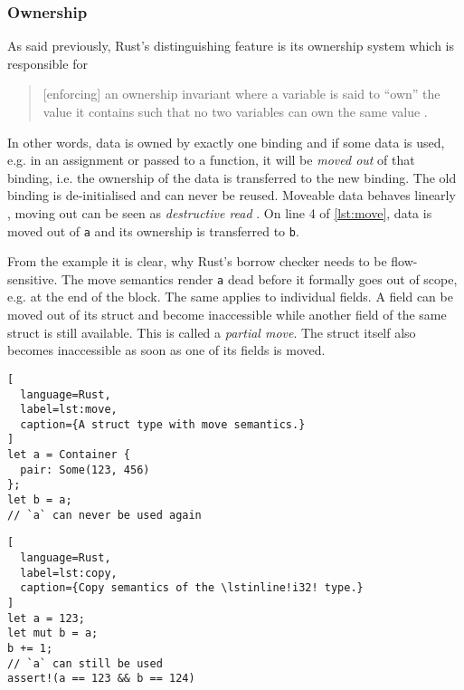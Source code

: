 \subsubsection{Ownership}

As said previously, Rust's distinguishing feature is its ownership system which
is responsible for

\begin{quote}
{[enforcing]} an ownership invariant where a
variable is said to ``own'' the value it contains such that no two variables can
own the same value \cite[page 5]{lightweight-formalism}.
\end{quote}

In other words, data is owned by exactly one binding and if some data is used,
e.g. in an assignment or passed to a function, it will be \emph{moved out} of
that binding, i.e. the ownership of the data is transferred to the new binding.
The old binding is de-initialised and can never be reused. Moveable data behaves
linearly \cite{oxide}, moving out can be seen as \emph{destructive read}
\cite{islands-alias-protection}. On line 4 of \autoref{lst:move}, data is moved
out of \lstinline!a! and its ownership is transferred to \lstinline!b!.

From the example it is clear, why Rust's borrow checker needs to be
flow-sensitive. The move semantics render \lstinline!a! dead before it formally
goes out of scope, e.g. at the end of the block. The same applies to individual
fields. A field can be moved out of its struct and become inaccessible while
another field of the same struct is still available. This is called a
\emph{partial move}. The struct itself also becomes inaccessible as soon as one
of its fields is moved.

\noindent\begin{minipage}[t]{.47\textwidth}
\begin{lstlisting}[
  language=Rust,
  label=lst:move,
  caption={A struct type with move semantics.}
]
let a = Container {
  pair: Some(123, 456)
};
let b = a;
// `a` can never be used again
\end{lstlisting}
\end{minipage}\hfill
\begin{minipage}[t]{.47\textwidth}
\begin{lstlisting}[
  language=Rust,
  label=lst:copy,
  caption={Copy semantics of the \lstinline!i32! type.}
]
let a = 123;
let mut b = a;
b += 1;
// `a` can still be used
assert!(a == 123 && b == 124)
\end{lstlisting}
\end{minipage}

